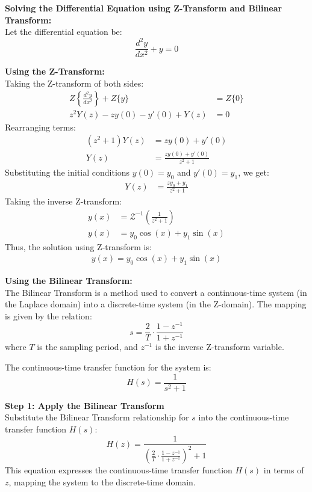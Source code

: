 \documentclass[journal]{IEEEtran}
\begin{document}
\textbf{Solving the Differential Equation using Z-Transform and Bilinear Transform:}\\
Let the differential equation be:
\[
\frac{d^2y}{dx^2} + y = 0
\]

\textbf{Using the Z-Transform:}\\
Taking the Z-transform of both sides:
\begin{align}
	Z\left\{\frac{d^2y}{dx^2}\right\} + Z\{y\} &= Z\{0\} \\
	z^2 Y(z) - z y(0) - y'(0) + Y(z) &= 0
\end{align}
Rearranging terms:
\begin{align}
	(z^2 + 1) Y(z) &= z y(0) + y'(0) \\
	Y(z) &= \frac{z y(0) + y'(0)}{z^2 + 1}
\end{align}
Substituting the initial conditions \(y(0) = y_0\) and \(y'(0) = y_1\), we get:
\begin{align}
	Y(z) &= \frac{z y_0 + y_1}{z^2 + 1}
\end{align}
Taking the inverse Z-transform:
\begin{align}
	y(x) &= \mathcal{Z}^{-1}\left( \frac{1}{z^2 + 1} \right) \\
	y(x) &= y_0 \cos(x) + y_1 \sin(x)
\end{align}
Thus, the solution using Z-transform is:
\begin{align}
	y(x) = y_0 \cos(x) + y_1 \sin(x)
\end{align}

\textbf{Using the Bilinear Transform:}\\
The Bilinear Transform is a method used to convert a continuous-time system (in the Laplace domain) into a discrete-time system (in the Z-domain). The mapping is given by the relation:
\[
s = \frac{2}{T} \cdot \frac{1 - z^{-1}}{1 + z^{-1}}
\]
where \( T \) is the sampling period, and \( z^{-1} \) is the inverse Z-transform variable.

The continuous-time transfer function for the system is:
\[
H(s) = \frac{1}{s^2 + 1}
\]

\textbf{Step 1: Apply the Bilinear Transform}\\
Substitute the Bilinear Transform relationship for \( s \) into the continuous-time transfer function \( H(s) \):
\[
H(z) = \frac{1}{\left( \frac{2}{T} \cdot \frac{1 - z^{-1}}{1 + z^{-1}} \right)^2 + 1}
\]
This equation expresses the continuous-time transfer function \( H(s) \) in terms of \( z \), mapping the system to the discrete-time domain.
\end{document}
